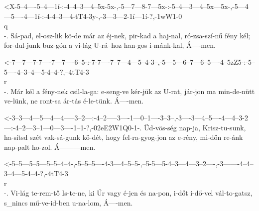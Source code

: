   {<X-5--4----5--4---1í-:-4--4--3---4--5x-5x-,-5---7---8-7---5x-:-5--4---3---4--5x---5x-,-5---4---5----4---1í-:-4-4--3---4-tT4-3y-,-3---3---2-1í---1í-?,-1wW1-0\\q\\-.}
  {   Sá-pad, el-osz-lik  kö-de már az éj-nek, pir-kad a haj-nal, ró-zsa-szí-nű fény kél; for-dul-junk buz-gón  a vi-lág U-rá--hoz  han-gos i-mánk-kal,  Á----men.}

  {<-7---7---7-7----7---7----6--5-:-7-7----7--7---4---5--4-3--,-5---5---6--7---6--5----4--5zZ5-:-5--5----4--3--4---5-4--4-?,--4tT4-3\\r\\-.}
  {  Már kél a fény-nek csil-la-ga: e-seng-ve kér-jük az U-rat, jár-jon ma min-de-nütt ve-lünk,  ne ront-sa ár-tás é-le-tünk. Á----men.}

  {<-3--3---4---5---4---4-----3--2---:-4--2-----3----1---0--1----3--3--,-3----3---4--5----4---4--3-2---:-4--2---3--1---0---3----1--1-?,-02eE2W1Q0-1-.}
  {  Üd-vös-ség nap-ja, Krisz-tu-sunk, ha-sítsd szét vak-sá-gunk kö-dét, hogy fel-ra-gyog-jon az e-rény, mi-dőn re-ánk nap-palt ho-zol. Á---------men.}

  {<-5--5---5--5---5--5--4--4-,-5--5--5----4-3---4--5--5-,--5-5---5-4--3---4---3--2----,-3-------4--4--3--4---5-4--4-?,-4tT4-3\\r\\-.}
  {  Vi-lág te-rem-tő Is-te-ne, ki Úr vagy é-jen és na-pon, i-dőt i-dő-vel vál-to-gatsz, s_nincs mű-ve-id-ben u-na-lom, Á----men.}


\deftone{1la-a}{<-[-4-3-rR3-1-.}{1. lá tónus}
\deftone{1re-a}{<-[-4-3-4t-4-.}{1. ré tónus}



\deftone{4-a}{<-[-4-5-4-2-.}{4. tónus}

